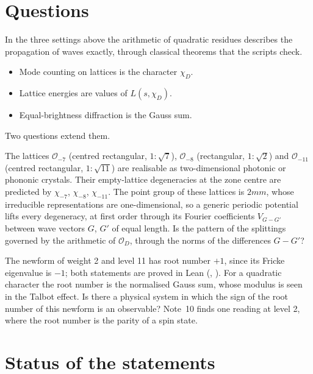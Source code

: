 \documentclass[11pt]{article}
\begin{document}
\section{Questions}

In the three settings above the arithmetic of quadratic residues describes the propagation of waves exactly, through classical theorems that the scripts check.
\begin{itemize}
\item Mode counting on lattices is the character $\chi_D$.
\item Lattice energies are values of $L(s,\chi_D)$.
\item Equal-brightness diffraction is the Gauss sum.
\end{itemize}
Two questions extend them.

\begin{question}
The lattices $\mathcal O_{-7}$ (centred rectangular, $1:\sqrt7$), $\mathcal O_{-8}$ (rectangular, $1:\sqrt2$) and $\mathcal O_{-11}$ (centred rectangular, $1:\sqrt{11}$) are realisable as two-dimensional photonic or phononic crystals.
Their empty-lattice degeneracies at the zone centre are predicted by $\chi_{-7}$, $\chi_{-8}$, $\chi_{-11}$.
The point group of these lattices is $2mm$, whose irreducible representations are one-dimensional, so a generic periodic potential lifts every degeneracy, at first order through its Fourier coefficients $V_{G-G'}$ between wave vectors $G$, $G'$ of equal length.
Is the pattern of the splittings governed by the arithmetic of $\mathcal O_D$, through the norms of the differences $G-G'$?
\end{question}

\begin{question}
The newform of weight 2 and level 11 has root number $+1$, since its Fricke eigenvalue is $-1$; both statements are proved in Lean (\formal, ).
For a quadratic character the root number is the normalised Gauss sum, whose modulus is seen in the Talbot effect. Is there a physical system in which the sign of the root number of this newform is an observable?
Note~10 finds one reading at level 2, where the root number is the parity of a spin state.
\end{question}

\section*{Status of the statements}
\end{document}
